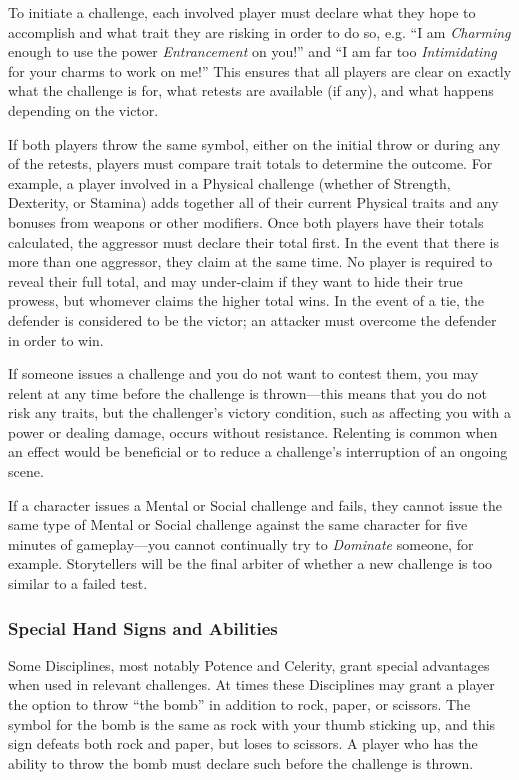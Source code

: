 \noindent To initiate a challenge, each involved player must declare what they hope to accomplish and what trait 
they are risking in order to do so, e.g. ``I am \emph{Charming} enough to use the power \emph{Entrancement} 
on you!'' and ``I am far too \emph{Intimidating} for your charms to work on me!''  This ensures that all 
players are clear on exactly what the challenge is for, what retests are available (if any), and what 
happens depending on the victor.

If both players throw the same symbol, either on the initial throw or during any of the retests, players 
must compare trait totals to determine the outcome.  For example, a player involved in a Physical challenge 
(whether of Strength, Dexterity, or Stamina) adds together all of their current Physical traits and any 
bonuses from weapons or other modifiers.  Once both players have their totals calculated, the aggressor must 
declare their total first.  In the event that there is more than one aggressor, they claim at the same time. 
No player is required to reveal their full total, and may under-claim if they want to hide their true 
prowess, but whomever claims the higher total wins.  In the event of a tie, the defender is considered to be 
the victor; an attacker must overcome the defender in order to win.

If someone issues a challenge and you do not want to contest them, you may relent at any time before the 
challenge is thrown---this means that you do not risk any traits, but the challenger's victory condition, 
such as affecting you with a power or dealing damage, occurs without resistance.  Relenting is common when 
an effect would be beneficial or to reduce a challenge's interruption of an ongoing scene.

If a character issues a Mental or Social challenge and fails, they cannot issue the same type of Mental or 
Social challenge against the same character for five minutes of gameplay---you cannot continually try to 
\emph{Dominate} someone, for example.  Storytellers will be the final arbiter of whether a new challenge is 
too similar to a failed test.

\subsubsection{Special Hand Signs and Abilities}
Some Disciplines, most notably Potence and Celerity, grant special advantages when used in relevant 
challenges.  At times these Disciplines may grant a player the option to throw ``the bomb'' in addition 
to rock, paper, or scissors.  The symbol for the bomb is the same as rock with your thumb sticking up, 
and this sign defeats both rock and paper, but loses to scissors.  A player who has the ability to throw 
the bomb must declare such before the challenge is thrown.

